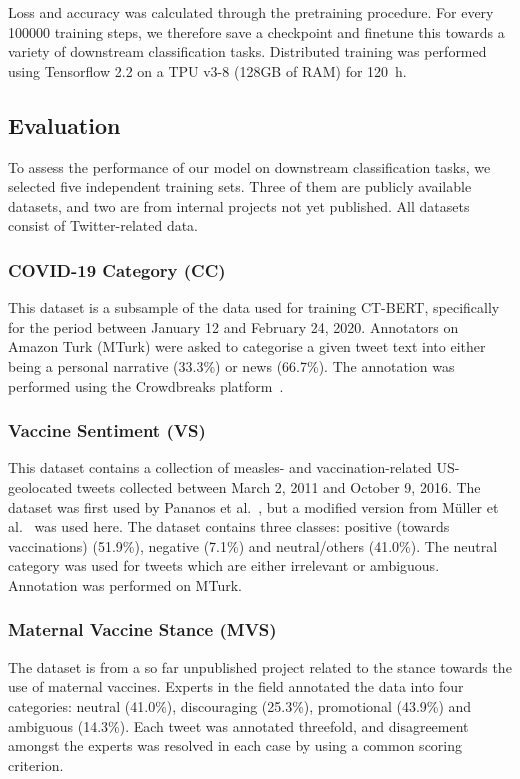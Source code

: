 \documentclass{article}
\begin{document}
Loss and accuracy was calculated through the pretraining procedure.
For every \num{100000} training steps, we therefore save a checkpoint and finetune this towards a variety of downstream classification tasks.
Distributed training was performed using Tensorflow 2.2 on a TPU v3-8 (128GB of RAM) for \SI{120}{\hour}.
\subsection{Evaluation}
To assess the performance of our model on downstream classification tasks, we selected five independent training sets.
Three of them are publicly available datasets, and two are from internal projects not yet published.
All datasets consist of Twitter-related data.

\subsubsection{COVID-19 Category (CC)}
This dataset is a subsample of the data used for training \textsc{CT-BERT}, specifically for the period between January 12 and February 24, 2020.
Annotators on Amazon Turk (MTurk) were asked to categorise a given tweet text into either being a personal narrative (33.3\%) or news (66.7\%).
The annotation was performed using the Crowdbreaks platform~\cite{muller2019crowdbreaks}.

\subsubsection{Vaccine Sentiment (VS)}
This dataset contains a collection of measles- and vaccination-related US-geolocated tweets collected between March 2, 2011 and October 9, 2016.
The dataset was first used by Pananos et al.~\cite{pananos2017critical}, but a modified version from M\"uller et al.~\cite{muller2019crowdbreaks} was used here.
The dataset contains three classes: positive (towards vaccinations) (51.9\%), negative (7.1\%) and neutral/others (41.0\%).
The neutral category was used for tweets which are either irrelevant or ambiguous. Annotation was performed on MTurk.

\subsubsection{Maternal Vaccine Stance (MVS)}
The dataset is from a so far unpublished project related to the stance towards the use of maternal vaccines.
Experts in the field annotated the data into four categories: neutral (41.0\%), discouraging (25.3\%), promotional (43.9\%) and ambiguous (14.3\%).
Each tweet was annotated threefold, and disagreement amongst the experts was resolved in each case by using a common scoring criterion.
\end{document}
